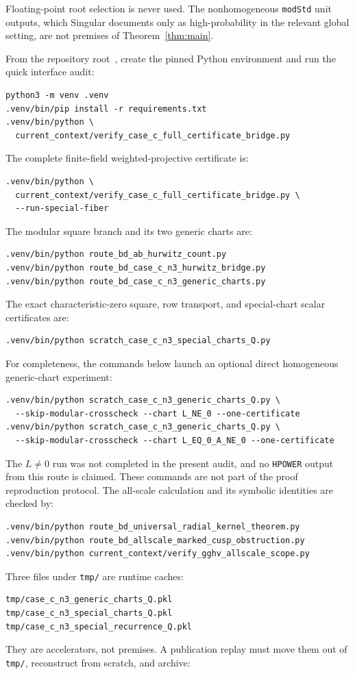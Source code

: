 \documentclass[11pt]{article}
\theoremstyle{definition}
\theoremstyle{remark}
\begin{document}
Floating-point root selection is never used.  The nonhomogeneous
\texttt{modStd} unit outputs, which Singular documents only as
high-probability in the relevant global setting, are not premises of
Theorem~\ref{thm:main}.

From the repository root~\cite{Archive}, create the pinned Python
environment and run the quick interface audit:
\begin{verbatim}
python3 -m venv .venv
.venv/bin/pip install -r requirements.txt
.venv/bin/python \
  current_context/verify_case_c_full_certificate_bridge.py
\end{verbatim}
The complete finite-field weighted-projective certificate is:
\begin{verbatim}
.venv/bin/python \
  current_context/verify_case_c_full_certificate_bridge.py \
  --run-special-fiber
\end{verbatim}
The modular square branch and its two generic charts are:
\begin{verbatim}
.venv/bin/python route_bd_ab_hurwitz_count.py
.venv/bin/python route_bd_case_c_n3_hurwitz_bridge.py
.venv/bin/python route_bd_case_c_n3_generic_charts.py
\end{verbatim}
The exact characteristic-zero square, row transport, and special-chart
scalar certificates are:
\begin{verbatim}
.venv/bin/python scratch_case_c_n3_special_charts_Q.py
\end{verbatim}
For completeness, the commands below launch an optional direct
homogeneous generic-chart experiment:
\begin{verbatim}
.venv/bin/python scratch_case_c_n3_generic_charts_Q.py \
  --skip-modular-crosscheck --chart L_NE_0 --one-certificate
.venv/bin/python scratch_case_c_n3_generic_charts_Q.py \
  --skip-modular-crosscheck --chart L_EQ_0_A_NE_0 --one-certificate
\end{verbatim}
The \(L\ne0\) run was not completed in the present audit, and no
\texttt{HPOWER} output from this route is claimed.  These commands are
not part of the proof reproduction protocol.
The all-scale calculation and its symbolic identities are checked by:
\begin{verbatim}
.venv/bin/python route_bd_universal_radial_kernel_theorem.py
.venv/bin/python route_bd_allscale_marked_cusp_obstruction.py
.venv/bin/python current_context/verify_gghv_allscale_scope.py
\end{verbatim}

Three files under \texttt{tmp/} are runtime caches:
\begin{verbatim}
tmp/case_c_n3_generic_charts_Q.pkl
tmp/case_c_n3_special_charts_Q.pkl
tmp/case_c_n3_special_recurrence_Q.pkl
\end{verbatim}
They are accelerators, not premises.  A publication replay must move
them out of \texttt{tmp/}, reconstruct from scratch, and archive:
\end{document}
